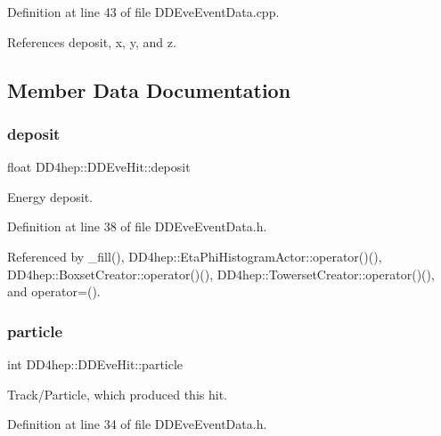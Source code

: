 Definition at line 43 of file D\+D\+Eve\+Event\+Data.\+cpp.



References deposit, x, y, and z.



\subsection{Member Data Documentation}
\hypertarget{class_d_d4hep_1_1_d_d_eve_hit_ad45cf3f4b4496c2b6db9de03ce77b4a6}{}\label{class_d_d4hep_1_1_d_d_eve_hit_ad45cf3f4b4496c2b6db9de03ce77b4a6} 
\subsubsection{\texorpdfstring{deposit}{deposit}}
{\footnotesize\ttfamily float D\+D4hep\+::\+D\+D\+Eve\+Hit\+::deposit}



Energy deposit. 



Definition at line 38 of file D\+D\+Eve\+Event\+Data.\+h.



Referenced by \+\_\+fill(), D\+D4hep\+::\+Eta\+Phi\+Histogram\+Actor\+::operator()(), D\+D4hep\+::\+Boxset\+Creator\+::operator()(), D\+D4hep\+::\+Towerset\+Creator\+::operator()(), and operator=().

\hypertarget{class_d_d4hep_1_1_d_d_eve_hit_a35b41dfc3b314771711c4b35ba1145f5}{}\label{class_d_d4hep_1_1_d_d_eve_hit_a35b41dfc3b314771711c4b35ba1145f5} 
\subsubsection{\texorpdfstring{particle}{particle}}
{\footnotesize\ttfamily int D\+D4hep\+::\+D\+D\+Eve\+Hit\+::particle}



Track/\+Particle, which produced this hit. 



Definition at line 34 of file D\+D\+Eve\+Event\+Data.\+h.

\hypertarget{class_d_d4hep_1_1_d_d_eve_hit_aa43de1b526423ff9a1dd54ac140b6941}{}\label{class_d_d4hep_1_1_d_d_eve_hit_aa43de1b526423ff9a1dd54ac140b6941} 
